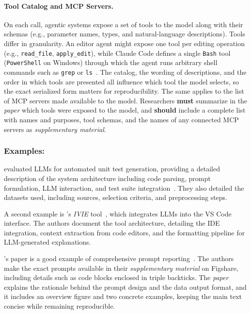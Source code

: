 \documentclass[smallextended]{svjour3}
\newcommand{\must}{\textbf{must}\xspace}
\newcommand{\should}{\textbf{should}\xspace}
\newcommand{\paper}{\emph{paper}\xspace}
\newcommand{\supplementarymaterial}{\emph{supplementary material}\xspace}
\newcommand{\paper}{\emph{paper}\xspace}
\newcommand{\supplementarymaterial}{\emph{supplementary material}\xspace}
\newcommand{\guidelinesubsubsection}[1]{\subsubsection{\bfseries #1:}}
\newcommand{\guidelineparagraph}[1]{\paragraph{#1.}}
\newcommand{\guidelinesubsubsection}[1]{\subsubsection{#1}}
\newcommand{\guidelineparagraph}[1]{\paragraph{#1}}
\begin{document}
\guidelineparagraph{Tool Catalog and MCP Servers}
On each call, agentic systems expose a set of tools to the model along with their schemas (e.g., parameter names, types, and natural-language descriptions).
Tools differ in granularity. An editor agent might expose one tool per editing operation (e.g., \texttt{read\_file}, \texttt{apply\_edit}), while Claude Code defines a single \texttt{Bash} tool (\texttt{PowerShell} on Windows) through which the agent runs arbitrary shell commands such as \texttt{grep} or \texttt{ls}~\cite{anthropic_tools_reference}.
The catalog, the wording of descriptions, and the order in which tools are presented all influence which tool the model selects, so the exact serialized form matters for reproducibility.
The same applies to the list of MCP servers made available to the model.
Researchers \must summarize in the \paper which tools were exposed to the model, and \should include a complete list with names and purposes, tool schemas, and the names of any connected MCP servers as \supplementarymaterial.

\guidelinesubsubsection{Examples}

\citeauthor{DBLP:journals/tse/SchaferNET24} evaluated LLMs for automated unit test generation, providing a detailed description of the system architecture including code parsing, prompt formulation, LLM interaction, and test suite integration~\cite{DBLP:journals/tse/SchaferNET24}.
They also detailed the datasets used, including sources, selection criteria, and preprocessing steps.

A second example is \citeauthor{DBLP:conf/chi/YanHWH24}'s \emph{IVIE} tool~\cite{DBLP:conf/chi/YanHWH24}, which integrates LLMs into the VS Code interface.
The authors document the tool architecture, detailing the IDE integration, context extraction from code editors, and the formatting pipeline for LLM-generated explanations.

\citeauthor{DBLP:journals/pacmse/LiangBBDFF024}'s paper is a good example of comprehensive prompt reporting~\cite{DBLP:journals/pacmse/LiangBBDFF024}.
The authors make the exact prompts available in their \supplementarymaterial on Figshare, including details such as code blocks enclosed in triple backticks.
The \paper explains the rationale behind the prompt design and the data output format, and it includes an overview figure and two concrete examples, keeping the main text concise while remaining reproducible.
\end{document}
